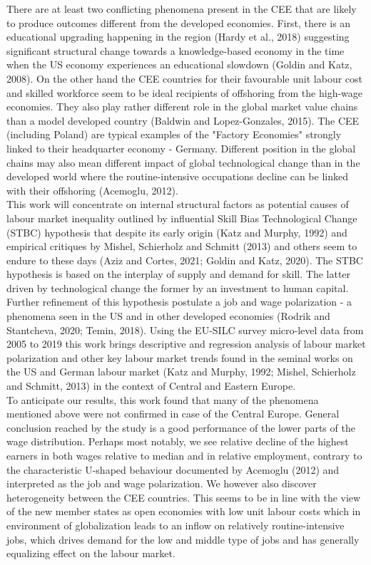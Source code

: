 \documentclass{article}
\begin{document}
 There are at least two conflicting phenomena present in the CEE that are likely to produce outcomes different from the developed economies. First, there is an educational upgrading happening in the region (Hardy et al., 2018) suggesting significant structural change towards a knowledge-based economy in the time when the US economy experiences an educational slowdown (Goldin and Katz, 2008). On the other hand the CEE countries for their favourable unit labour cost and skilled workforce seem to be ideal recipients of offshoring from the high-wage economies. They also play rather different role in the global market value chains than a model developed country (Baldwin and Lopez-Gonzales, 2015). The CEE (including Poland) are typical examples of the "Factory Economies" strongly linked to their headquarter economy - Germany. %
Different position in the global chains may also mean different impact of global technological change than in the developed world where the routine-intensive occupations decline can be linked with their offshoring (Acemoglu, 2012).
\\
This work will concentrate on internal structural factors as potential causes of labour market inequality outlined by influential Skill Bias Technological Change (STBC) hypothesis that despite its early origin (Katz and Murphy, 1992) and empirical critiques by Mishel, Schierholz and Schmitt (2013) and others seem to endure to these days (Aziz and Cortes, 2021; Goldin and Katz, 2020). The STBC hypothesis is based on the interplay of supply and demand for skill. The latter driven by technological change the former by an investment to human capital. Further refinement of this hypothesis postulate a job and wage polarization - a phenomena seen in the US and in other developed economies (Rodrik and Stantcheva, 2020; Temin, 2018). Using the EU-SILC survey micro-level data from 2005 to 2019 this work brings descriptive and regression analysis of labour market polarization and other key labour market trends found in the seminal works on the US and German labour market (Katz and Murphy, 1992; Mishel, Schierholz and Schmitt, 2013) in the context of Central and Eastern Europe.
\\
To anticipate our results, this work found that many of the phenomena mentioned above were not confirmed in case of the Central Europe. General conclusion reached by the study is a good performance of the lower parts of the wage distribution. Perhaps most notably, we see relative decline of the highest earners in both wages relative to median and in relative employment, contrary to the characteristic U-shaped behaviour documented by Acemoglu (2012) and interpreted as the job and wage polarization. We however also discover heterogeneity between the CEE countries.
This seems to be in line with the view of the new member states as open economies with low unit labour costs which in environment of globalization leads to an inflow on relatively routine-intensive jobs, which drives demand for the low and middle type of jobs and has generally equalizing effect on the labour market. 
\end{document}

